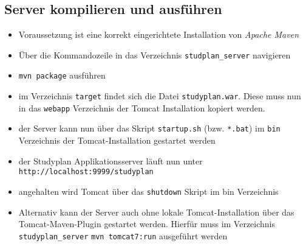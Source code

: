 \subsection{Server kompilieren und ausführen}
\begin{itemize}
	\item Voraussetzung ist eine korrekt eingerichtete Installation von \textit{Apache Maven}
	\item Über die Kommandozeile in das Verzeichnis \texttt{studplan\_server} navigieren
	\item \texttt{mvn package} ausführen
	\item im Verzeichnis \texttt{target} findet sich die Datei \texttt{studyplan.war}. Diese muss nun in das \texttt{webapp} Verzeichnis der Tomcat Installation kopiert werden.
	\item der Server kann nun über das Skript \texttt{startup.sh} (bzw. \texttt{*.bat}) im \texttt{bin} Verzeichnis der Tomcat-Installation gestartet werden
	\item der Studyplan Applikationsserver läuft nun unter \texttt{http://localhost:9999/studyplan}
	\item angehalten wird Tomcat über das \texttt{shutdown} Skript im bin Verzeichnis
	\item Alternativ kann der Server auch ohne lokale Tomcat-Installation über das Tomcat-Maven-Plugin gestartet werden. Hierfür muss im Verzeichnis \texttt{studyplan\_server} \texttt{mvn tomcat7:run} ausgeführt werden
\end{itemize}
